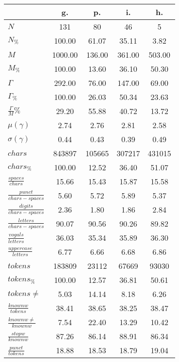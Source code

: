 \begin{table}[h!]
\begin{center}
\begin{tabular}{| l || c | c | c | c |}\hline
 & {\bf g.} & {\bf p.} & {\bf i.} & {\bf h.} \\\hline\hline
$N$ & 131  & 80  & 46  & 5 \\
$N_{\%}$ & 100.00  & 61.07  & 35.11  & 3.82 \\\hline
$M$ & 1000.00  & 136.00  & 361.00  & 503.00 \\
$M_{\%}$ & 100.00  & 13.60  & 36.10  & 50.30 \\\hline
$\Gamma$ & 292.00  & 76.00  & 147.00  & 69.00 \\
$\Gamma_{\%}$ & 100.00  & 26.03  & 50.34  & 23.63 \\\hline
$\frac{\Gamma}{M}\%$ & 29.20  & 55.88  & 40.72  & 13.72 \\
$\mu(\gamma)$ & 2.74  & 2.76  & 2.81  & 2.58 \\
$\sigma(\gamma)$ & 0.44  & 0.43  & 0.39  & 0.49 \\\hline\hline
$chars$ & 843897  & 105665  & 307217  & 431015 \\
$chars_{\%}$ & 100.00  & 12.52  & 36.40  & 51.07 \\\hline
$\frac{spaces}{chars}$ & 15.66  & 15.43  & 15.87  & 15.58 \\
$\frac{punct}{chars-spaces}$ & 5.60  & 5.72  & 5.89  & 5.37 \\
$\frac{digits}{chars-spaces}$ & 2.36  & 1.80  & 1.86  & 2.84 \\\hline
$\frac{letters}{chars-spaces}$ & 90.07  & 90.56  & 90.26  & 89.82 \\
$\frac{vogals}{letters}$ & 36.03  & 35.34  & 35.89  & 36.30 \\
$\frac{uppercase}{letters}$ & 6.77  & 6.66  & 6.68  & 6.86 \\\hline\hline
$tokens$ & 183809  & 23112  & 67669  & 93030 \\
$tokens_{\%}$ & 100.00  & 12.57  & 36.81  & 50.61 \\
$tokens \neq$ & 5.03  & 14.14  & 8.18  & 6.26 \\\hline
$\frac{knownw}{tokens}$ & 38.41  & 38.65  & 38.25  & 38.47 \\
$\frac{knownw \neq}{knownw}$ & 7.54  & 22.40  & 13.29  & 10.42 \\\hline
$\frac{stopw}{knownw}$ & 87.26  & 86.14  & 88.91  & 86.34 \\
$\frac{punct}{tokens}$ & 18.88  & 18.53  & 18.79  & 19.04 \\

\end{tabular}
\end{center}
\end{table}

